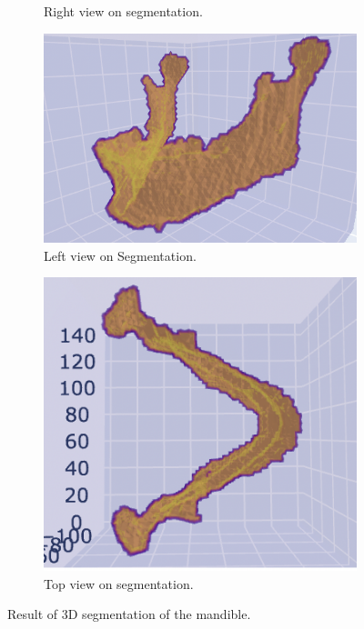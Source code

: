 \begin{figure}
\begin{subfigure}{0.3\linewidth}
		\caption{Right view on segmentation.}
	\end{subfigure}
	\hfill
	\begin{subfigure}{0.3\linewidth}
		\centering
		\includegraphics[width=\linewidth]{Materials/R3DSeg}
		\caption{Left view on Segmentation.}
	\end{subfigure}
	\hfill
	\begin{subfigure}{0.3\linewidth}
		\centering
		\includegraphics[width=\linewidth]{Materials/T3DSeg}
		\caption{Top view on segmentation.}
	\end{subfigure}
	\caption{Result of 3D segmentation of the mandible.}
	\label{mandible}
\end{figure}
